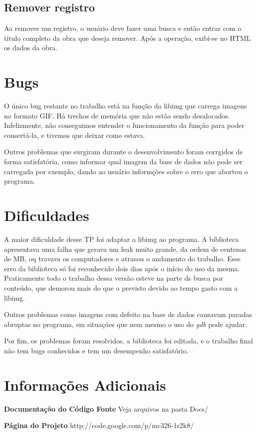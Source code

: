 \documentclass[10pt,a4paper,draft]{article}
\begin{document}
\subsection{Remover registro}
Ao remover um registro, o usuário deve fazer uma busca e então entrar com o titulo completo da obra que deseja remover. Após a operação, exibi-se no HTML os dados da obra.

\section{Bugs}
O único bug restante no trabalho está na função da libimg que carrega imagens no formato GIF. Há trechos de memória que não estão sendo desalocados. Infelizmente, não conseguimos entender o funcionamento da função para poder consertá-la, e tivemos que deixar como estava.

Outros problemas que surgiram durante o desenvolvimento foram corrgidos de forma satisfatória, como informar qual imagem da base de dados não pode ser carregada por exemplo, dando ao usuário informções sobre o erro que abortou o programa.

\section{Dificuldades}
A maior dificuldade desse TP foi adaptar a libimg ao programa. A biblioteca apresentava uma falha que gerava um leak muito grande, da ordem de centenas de MB, oq travava os computadores e atrasou o andamento do trabalho. Esse erro da biblioteca só foi reconhecido dois dias após o início do uso da mesma. Praticamente todo o trabalho dessa versão esteve na parte ds busca por conteúdo, que demorou mais do que o previsto devido ao tempo gasto com a libimg.

Outros problemas como imagens com defeito na base de dados causavam paradas abruptas no programa, em situações que nem mesmo o uso do \textit{gdb} pode ajudar.

Por fim, os problemas foram resolvidos, a biblioteca foi editada, e o trabalho final não tem bugs conhecidos e tem um desempenho satisfatório.

\section{Informações Adicionais}
\textbf{Documentação do Código Fonte}
Veja arquivos na pasta Docs/

\textbf{Página do Projeto}
http://code.google.com/p/mc326-1s2k8/
\end{document}
